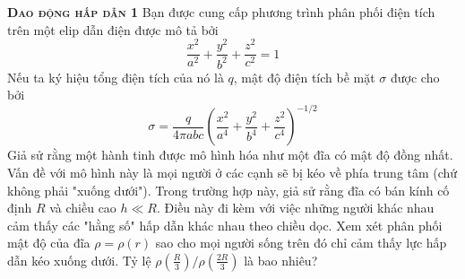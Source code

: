 \begin{problem}
\textbf{\textsc{Dao động hấp dẫn 1}}
Bạn được cung cấp phương trình phân phối điện tích trên một elip dẫn điện được mô tả bởi 
\[
\frac{x^2}{a^2} + \frac{y^2}{b^2} + \frac{z^2}{c^2} = 1
\]
Nếu ta ký hiệu tổng điện tích của nó là \(q\), mật độ điện tích bề mặt \(\sigma\) được cho bởi
\begin{equation*}
\sigma = \frac{q}{4\pi abc} \left( \frac{x^2}{a^4} + \frac{y^2}{b^4} + \frac{z^2}{c^4} \right)^{-1 / 2}
\label{ellipsoidCharge}
\end{equation*}
Giả sử rằng một hành tinh được mô hình hóa như một đĩa có mật độ đồng nhất. Vấn đề với mô hình này là mọi người ở các cạnh sẽ bị kéo về phía trung tâm (chứ không phải "xuống dưới"). Trong trường hợp này, giả sử rằng đĩa có bán kính cố định \(R\) và chiều cao \(h \ll R\). Điều này đi kèm với việc những người khác nhau cảm thấy các "hằng số" hấp dẫn khác nhau theo chiều dọc. Xem xét phân phối mật độ của đĩa \(\rho = \rho(r)\) sao cho mọi người sống trên đó chỉ cảm thấy lực hấp dẫn kéo xuống dưới. Tỷ lệ $\rho(\frac{R}{3})/\rho(\frac{2R}{3})$ là bao nhiêu?

\end{problem}
